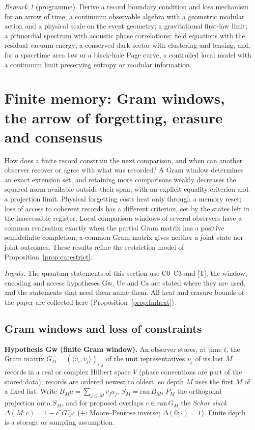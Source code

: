 \documentclass[aps,pra,onecolumn,superscriptaddress,nofootinbib,10pt]{revtex4-2}
\theoremstyle{definition}
\theoremstyle{remark}
\newtheorem{remark}[theorem]{Remark}
\newcommand{\ip}[2]{\langle #1,#2\rangle}
\begin{document}
\begin{remark}[programme]\label{rem:cuprogramme}
Derive a record boundary condition and loss mechanism for an arrow of time; a continuum observable
algebra with a geometric modular action and a physical scale on the event geometry; a gravitational
first-law limit; a primordial spectrum with acoustic phase correlations; field equations with the
residual vacuum energy; a conserved dark sector with clustering and lensing; and, for a spacetime area
law or a black-hole Page curve, a controlled local model with a continuum limit preserving entropy or
modular information.
\end{remark}


\section{Finite memory: Gram windows, the arrow of forgetting, erasure and consensus}\label{sec:finitemem}
How does a finite record constrain the next comparison, and when can another observer recover or agree
with what was recorded?  A Gram window determines an exact extension set, and retaining more comparisons
weakly decreases the squared norm available outside their span, with an explicit equality criterion and a
projection limit.  Physical forgetting costs heat only through a memory reset; loss of access to coherent
records has a different criterion, set by the states left in the inaccessible register.  Local
comparison windows of several observers have a common realisation exactly when the partial Gram matrix
has a positive semidefinite completion; a common Gram matrix gives neither a joint state nor joint
outcomes.  These results refine the restriction model of Proposition~\ref{prop:curestrict}.

\noindent\emph{Inputs.}  The quantum statements of this section use C0--C3 and [T]; the window, encoding and access
hypotheses Gw, Ue and Ca are stated where they are used, and the statements that need them name them.  All heat
and erasure bounds of the paper are collected here (Proposition~\ref{prop:fmheat}).

\subsection{Gram windows and loss of constraints}\label{sec:fmwindows}

\smallskip\noindent\textbf{Hypothesis Gw (finite Gram window).}\label{hyp:Gw}  An observer stores, at time $t$, the Gram matrix
$G_M=(\ip{v_i}{v_j})_{i,j}$ of the unit representatives $v_j$ of its last $M$ records in a real or complex Hilbert space $V$
(phase conventions are part of the stored data); records are ordered newest to oldest, so depth $M$ uses the
first $M$ of a fixed list.  Write $B_Ma=\sum_{j\le M}v_ja_j$, $S_M=\mathrm{ran}\,B_M$, $P_M$ the orthogonal projection onto $S_M$, and for
proposed overlaps $c\in\mathrm{ran}\,G_M$ the \emph{Schur slack} $\Delta(M;c)=1-c^*G_M^+c$ ($+$: Moore--Penrose inverse; $\Delta(0;\cdot)=1$).  Finite
depth is a storage or sampling assumption.
\end{document}
